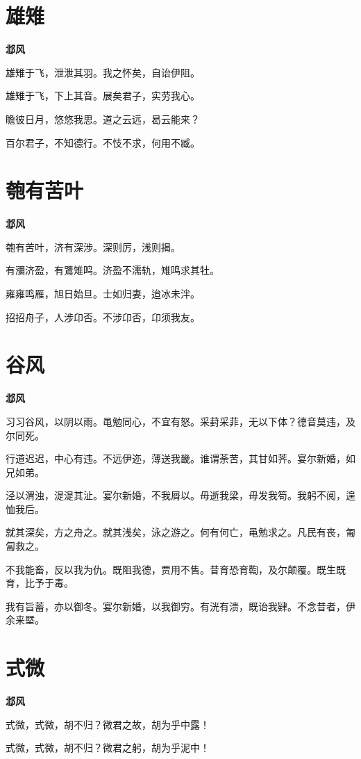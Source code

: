 \documentclass[12pt,a4paper]{ctexbook}
\begin{document}
\section{雄雉}
\textbf{邶风}\par\vspace{0.5em}
雄雉于飞，泄泄其羽。我之怀矣，自诒伊阻。\par
雄雉于飞，下上其音。展矣君子，实劳我心。\par
瞻彼日月，悠悠我思。道之云远，曷云能来？\par
百尔君子，不知德行。不忮不求，何用不臧。\par

\section{匏有苦叶}
\textbf{邶风}\par\vspace{0.5em}
匏有苦叶，济有深涉。深则厉，浅则揭。\par
有瀰济盈，有鷕雉鸣。济盈不濡轨，雉鸣求其牡。\par
雍雍鸣雁，旭日始旦。士如归妻，迨冰未泮。\par
招招舟子，人涉卬否。不涉卬否，卬须我友。\par

\section{谷风}
\textbf{邶风}\par\vspace{0.5em}
习习谷风，以阴以雨。黾勉同心，不宜有怒。采葑采菲，无以下体？德音莫违，及尔同死。\par
行道迟迟，中心有违。不远伊迩，薄送我畿。谁谓荼苦，其甘如荠。宴尔新婚，如兄如弟。\par
泾以渭浊，湜湜其沚。宴尔新婚，不我屑以。毋逝我梁，毋发我笱。我躬不阅，遑恤我后。\par
就其深矣，方之舟之。就其浅矣，泳之游之。何有何亡，黾勉求之。凡民有丧，匍匐救之。\par
不我能畜，反以我为仇。既阻我德，贾用不售。昔育恐育鞫，及尔颠覆。既生既育，比予于毒。\par
我有旨蓄，亦以御冬。宴尔新婚，以我御穷。有洸有溃，既诒我肄。不念昔者，伊余来塈。\par

\section{式微}
\textbf{邶风}\par\vspace{0.5em}
式微，式微，胡不归？微君之故，胡为乎中露！\par
式微，式微，胡不归？微君之躬，胡为乎泥中！\par
\end{document}
